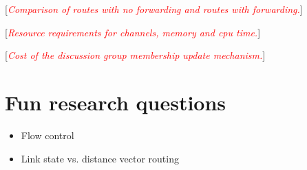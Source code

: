 \documentclass[a4paper,twoside]{report} %
\newcommand{\note}[1]{[\textcolor{red}{\textit{#1}}]}
\begin{document}
\note{Comparison of routes with no forwarding and routes with forwarding.}

\note{Resource requirements for channels, memory and cpu time.}

\note{Cost of the discussion group membership update mechanism.}

\chapter{Fun research questions}

\begin{itemize}
\item Flow control
\item Link state vs. distance vector routing
\end{itemize}



\end{document}
